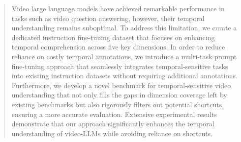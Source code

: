 \begin{abstract}
Video large language models have achieved remarkable performance in tasks such as video question answering, however, their temporal understanding remains suboptimal. To address this limitation, we curate a dedicated instruction fine-tuning dataset that focuses on enhancing temporal comprehension across five key dimensions.  In order to reduce reliance on costly temporal annotations, we introduce a multi-task prompt fine-tuning approach that seamlessly integrates temporal-sensitive tasks into existing instruction datasets without requiring additional annotations. Furthermore, we develop a novel benchmark for temporal-sensitive video understanding that not only fills the gaps in dimension coverage left by existing benchmarks but also rigorously filters out potential shortcuts, ensuring a more accurate evaluation. Extensive experimental results demonstrate that our approach significantly enhances the temporal understanding of video-LLMs while avoiding reliance on shortcuts.



\end{abstract}